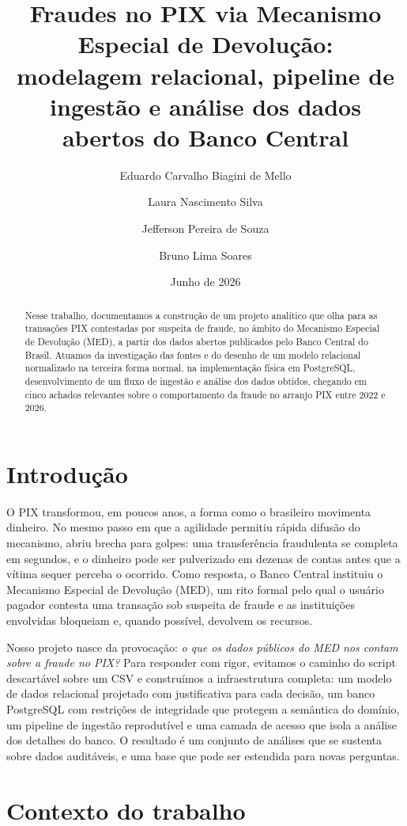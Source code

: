 \documentclass[12pt,a4paper]{article}
\title{\textbf{Fraudes no PIX via Mecanismo Especial de
Devolução:}\\ modelagem relacional, pipeline de ingestão e análise dos
dados abertos do Banco Central}
\author{Eduardo Carvalho Biagini de Mello
   \and Laura Nascimento Silva
   \and Jefferson Pereira de Souza
   \and Bruno Lima Soares}
\date{Junho de 2026}
\begin{document}
\maketitle

\begin{abstract}
\noindent Nesse trabalho, documentamos a construção de um projeto analítico que olha para as transações PIX contestadas por suspeita de fraude, no âmbito do Mecanismo Especial de Devolução (MED), a partir dos dados abertos publicados pelo Banco Central do Brasil. Atuamos da investigação das fontes e do desenho de um modelo relacional normalizado na terceira forma normal, na implementação física em PostgreSQL, desenvolvimento de um fluxo de ingestão e análise dos dados obtidos, chegando em cinco achados relevantes sobre o comportamento da fraude no arranjo PIX entre 2022 e 2026.
\end{abstract}

\section{Introdução}

O PIX transformou, em poucos anos, a forma como o brasileiro movimenta
dinheiro. No mesmo passo em que a agilidade permitiu rápida difusão do mecanismo, abriu brecha para golpes: uma transferência fraudulenta se completa em
segundos, e o dinheiro pode ser pulverizado em dezenas de contas antes que a
vítima sequer perceba o ocorrido. Como resposta, o Banco Central instituiu o
Mecanismo Especial de Devolução (MED), um rito formal pelo qual o usuário
pagador contesta uma transação sob suspeita de fraude e as instituições
envolvidas bloqueiam e, quando possível, devolvem os recursos.

Nosso projeto nasce da provocação: \emph{o que os dados públicos do
MED nos contam sobre a fraude no PIX?} Para responder com rigor, evitamos o
caminho do script descartável sobre um CSV e construímos a infraestrutura
completa: um modelo de dados relacional projetado com justificativa para cada
decisão, um banco PostgreSQL com restrições de integridade que protegem a
semântica do domínio, um pipeline de ingestão reprodutível e uma camada de
acesso que isola a análise dos detalhes do banco. O resultado é um conjunto
de análises que se sustenta sobre dados auditáveis, e uma base que pode ser
estendida para novas perguntas.

\section{Contexto do trabalho}
\end{document}
